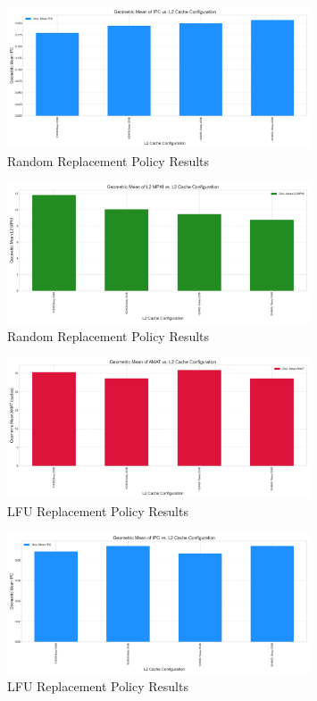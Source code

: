 \documentclass{article}
\begin{document}
\begin{figure}[H]
    \centering
    \includegraphics[width=0.8\textwidth]{figures/random/ipc_random.png}
    \caption{Random Replacement Policy Results}
    \label{fig:random_ipc}
\end{figure}

\begin{figure}[H]
    \centering
    \includegraphics[width=0.8\textwidth]{figures/random/mpki_random.png}
    \caption{Random Replacement Policy Results}
    \label{fig:random_mpki}
\end{figure}

\begin{figure}[H]
    \centering
    \includegraphics[width=0.8\textwidth]{figures/lfu/amat_lfu.png}
    \caption{LFU Replacement Policy Results}
    \label{fig:lfu_amat}
\end{figure}

\begin{figure}[H]
    \centering
    \includegraphics[width=0.8\textwidth]{figures/lfu/ipc_lfu.png}
    \caption{LFU Replacement Policy Results}
    \label{fig:lfu_ipc}
\end{figure}
\end{document}
